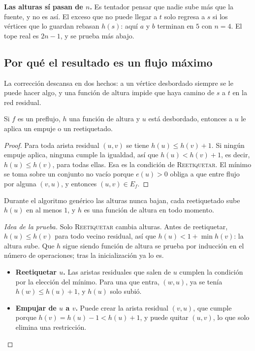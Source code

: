 \documentclass[11pt,letterpaper]{article}
\begin{document}
\begin{ojo}
  \textbf{Las alturas sí pasan de $n$.} Es tentador pensar que nadie
  sube más que la fuente, y no es así. El exceso que no puede llegar a
  $t$ solo regresa a $s$ si los vértices que lo guardan rebasan $h(s)$:
  aquí $a$ y $b$ terminan en $5$ con $n = 4$. El tope real es
  $2n - 1$, y se prueba más abajo.
\end{ojo}


\subsection*{Por qué el resultado es un flujo máximo}

La corrección descansa en dos hechos: a un vértice desbordado siempre
se le puede hacer algo, y una función de altura impide que haya camino
de $s$ a $t$ en la red residual.

\begin{lema}
  \label{lem:push-siempre-aplica}
  Si $f$ es un preflujo, $h$ una función de altura y $u$ está
  desbordado, entonces a $u$ le aplica un empuje o un reetiquetado.
\end{lema}

\begin{proof}
  Para toda arista residual $(u, v)$ se tiene $h(u) \le h(v) + 1$. Si
  ningún empuje aplica, ninguna cumple la igualdad, así que
  $h(u) < h(v) + 1$, es decir, $h(u) \le h(v)$, para todas ellas. Esa
  es la condición de \textsc{Reetiquetar}. El mínimo se toma sobre un
  conjunto no vacío porque $e(u) > 0$ obliga a que entre flujo por
  alguna $(v, u)$, y entonces $(u, v) \in E_f$.
\end{proof}

\begin{lema}
  \label{lem:push-altura-valida}
  Durante el algoritmo genérico las alturas nunca bajan, cada
  reetiquetado sube $h(u)$ en al menos $1$, y $h$ es una función de
  altura en todo momento.
\end{lema}

\begin{proof}[Idea de la prueba]
  Solo \textsc{Reetiquetar} cambia alturas. Antes de reetiquetar,
  $h(u) \le h(v)$ para todo vecino residual, así que
  $h(u) < 1 + \min h(v)$: la altura sube. Que $h$ sigue siendo
  función de altura se prueba por inducción en el número de
  operaciones; tras la inicialización ya lo es.
  \begin{itemize}
    \item \textbf{Reetiquetar $u$.} Las aristas residuales que salen de
          $u$ cumplen la condición por la elección del mínimo. Para una
          que entra, $(w, u)$, ya se tenía $h(w) \le h(u) + 1$, y
          $h(u)$ solo subió.
    \item \textbf{Empujar de $u$ a $v$.} Puede crear la arista residual
          $(v, u)$, que cumple porque $h(v) = h(u) - 1 < h(u) + 1$, y
          puede quitar $(u, v)$, lo que solo elimina una restricción.
          \qedhere
  \end{itemize}
\end{proof}
\end{document}
